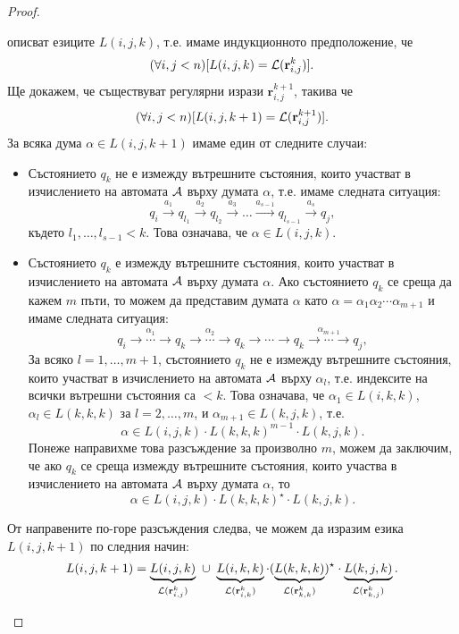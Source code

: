 \begin{proof}
\begin{enumerate}[a)]
    описват езиците $L(i,j,k)$, т.е. имаме индукционното предположение, че
    \[(\forall i,j < n)[L(i,j,k) = \mathcal{L}(\mathbf{r}^{k}_{i,j})].\] 
    Ще докажем, че съществуват регулярни изрази $\mathbf{r}^{k+1}_{i,j}$, такива че
    \[(\forall i,j < n)[L(i,j,k+1) = \mathcal{L}(\mathbf{r}^{k+1}_{i,j})].\] 
    За всяка дума $\alpha \in L(i,j,k+1)$ имаме един от следните случаи:
    \begin{itemize}
    \item
      Състоянието $q_k$ не е измежду вътрешните състояния, които участват в изчислението на автомата $\mathcal{A}$ върху думата $\alpha$, т.е. имаме следната ситуация:
      \[q_i\stackrel{a_1}{\rightarrow} q_{l_1} \stackrel{a_2}{\rightarrow} q_{l_2} \stackrel{a_3}{\rightarrow} \dots \stackrel{a_{s-1}}{\rightarrow} q_{l_{s-1}}\stackrel{a_s}{\rightarrow} q_j,\]
      където $l_1,\dots,l_{s-1} < k$.
      Това означава, че $\alpha \in L(i,j,k)$.
    \item
      Състоянието $q_k$ е измежду вътрешните състояния, които участват в изчислението на автомата $\mathcal{A}$ върху думата $\alpha$.
      Ако състоянието $q_k$ се среща да кажем $m$ пъти, то можем да представим думата $\alpha$ като $\alpha = \alpha_1\alpha_2\cdots\alpha_{m+1}$ и имаме следната ситуация:
      \[q_i\stackrel{\alpha_1}{\rightarrow\cdots\rightarrow} q_{k} \stackrel{\alpha_2}{\rightarrow\cdots\rightarrow} q_k \rightarrow\cdots\rightarrow q_{k} \stackrel{\alpha_{m+1}}{\rightarrow\cdots\rightarrow} q_j,\]
      За всяко $l=1,\dots,m+1$, състоянието $q_k$ не е измежду вътрешните състояния, които участват в изчислението на автомата $\mathcal{A}$ върху $\alpha_l$, т.е. индексите на всички вътрешни състояния са $<k$.
      Това означава, че $\alpha_1 \in L(i,k,k)$, $\alpha_l \in L(k,k,k)$ за $l=2,\dots,m$, и $\alpha_{m+1} \in L(k,j,k)$, т.е.
      \[\alpha \in L(i,j,k) \cdot L(k,k,k)^{m-1} \cdot L(k,j,k).\]
      Понеже направихме това разсъждение за произволно $m$,
      можем да заключим, че ако $q_k$ се среща измежду вътрешните състояния, които участва в изчислението на автомата $\mathcal{A}$ върху думата $\alpha$,
      то \[\alpha \in L(i,j,k) \cdot L(k,k,k)^\star \cdot L(k,j,k).\]
    \end{itemize}
    От направените по-горе разсъждения следва, че можем да изразим езика $L(i,j,k+1)$ по следния начин:
    \[L(i,j,k+1) = \underbrace{L(i,j,k)}_{\L(\mathbf{r}^{k}_{i,j})}\ \cup\ \underbrace{L(i,k,k)}_{\L(\mathbf{r}^{k}_{i,k})}\cdot (\underbrace{L(k,k,k)}_{\L(\mathbf{r}^{k}_{k,k})})^\star \cdot \underbrace{L(k,j,k)}_{\L(\mathbf{r}^{k}_{k,j})}.\]

\end{enumerate}
\end{proof}
